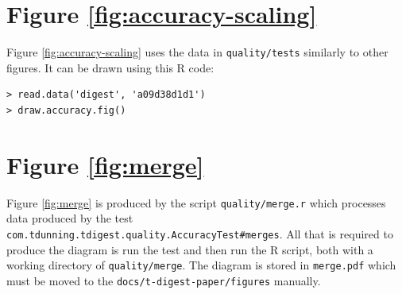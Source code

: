 \documentclass[]{statsoc}
\begin{document}
\section*{Figure \ref{fig:accuracy-scaling}}
Figure \ref{fig:accuracy-scaling} uses the data in {\tt quality/tests} similarly to other figures. It can be drawn using this R code:
\begin{verbatim}
> read.data('digest', 'a09d38d1d1')
> draw.accuracy.fig()
\end{verbatim}
\section*{Figure \ref{fig:merge}}
Figure \ref{fig:merge} is produced by the script {\tt quality/merge.r} which processes data produced by the test {\tt com.tdunning.tdigest.quality.AccuracyTest\#merges}. All that is required to produce the diagram is run the test and then run the R script, both with a working directory of {\tt quality/merge}. The diagram is stored in {\tt merge.pdf} which must be moved to the {\tt docs/t-digest-paper/figures} manually.
\end{document}
